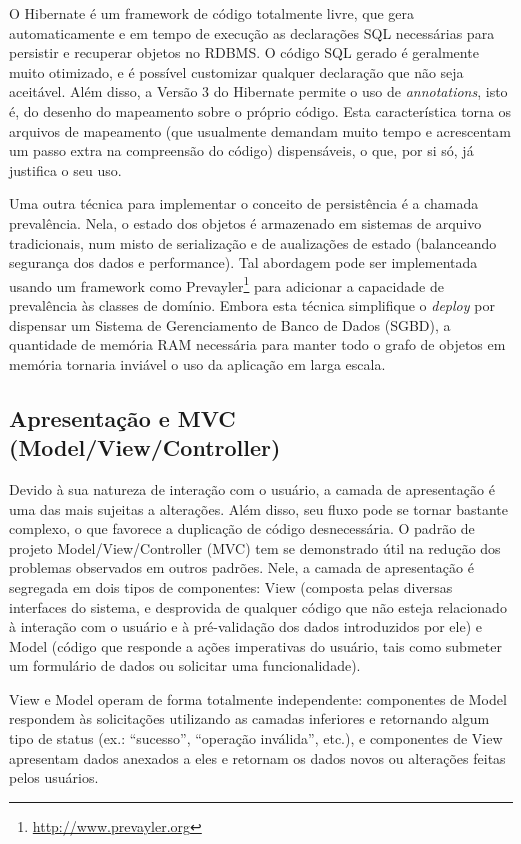 \documentclass{abnt}
\begin{document}
	O Hibernate é um framework de código totalmente livre, que gera automaticamente e em tempo de execução as declarações SQL necessárias para persistir e recuperar objetos no RDBMS. O código SQL gerado é geralmente muito otimizado, e é possível customizar qualquer declaração que não seja aceitável. Além disso, a Versão 3 do Hibernate permite o uso de \textit{annotations}, isto é, do desenho do mapeamento sobre o próprio código. Esta característica torna os arquivos de mapeamento (que usualmente demandam muito tempo e acrescentam um passo extra na compreensão do código) dispensáveis, o que, por si só, já justifica o seu uso.

	Uma outra técnica para implementar o conceito de persistência é a chamada prevalência. Nela, o estado dos objetos é armazenado em sistemas de arquivo tradicionais, num misto de serialização e de aualizações de estado (balanceando segurança dos dados e performance). Tal abordagem pode ser implementada usando um framework como Prevayler\footnote{\url{http://www.prevayler.org}} para adicionar a capacidade de prevalência às classes de domínio. Embora esta técnica simplifique o \textit{deploy} por dispensar um Sistema de Gerenciamento de Banco de Dados (SGBD), a quantidade de memória RAM necessária para manter todo o grafo de objetos em memória tornaria inviável o uso da aplicação em larga escala.

	\subsection{Apresentação e MVC (Model/View/Controller)}

	Devido à sua natureza de interação com o usuário, a camada de apresentação é uma das mais sujeitas a alterações. Além disso, seu fluxo pode se tornar bastante complexo, o que favorece a duplicação de código desnecessária. O padrão de projeto Model/View/Controller (MVC) tem se demonstrado útil na redução dos problemas observados em outros padrões. Nele, a camada de apresentação é segregada em dois tipos de componentes: View (composta pelas diversas interfaces do sistema, e desprovida de qualquer código que não esteja relacionado à interação com o usuário e à pré-validação dos dados introduzidos por ele) e Model (código que responde a ações imperativas do usuário, tais como submeter um formulário de dados ou solicitar uma funcionalidade).

	View e Model operam de forma totalmente independente: componentes de Model respondem às solicitações utilizando as camadas inferiores e retornando algum tipo de status (ex.: “sucesso”, “operação inválida”, etc.), e componentes de View apresentam dados anexados a eles e retornam os dados novos ou alterações feitas pelos usuários.
\end{document}
